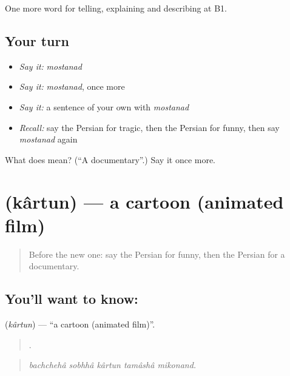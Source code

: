 \begin{grammarlens}[title={What you've built}]
One more word for telling, explaining and describing at B1.
\end{grammarlens}

\subsection*{Your turn}
\begin{itemize}
\raggedright
  \item \emph{Say it:} \emph{mostanad}
  \item \emph{Say it:} \emph{mostanad}, once more
  \item \emph{Say it:} a sentence of your own with \emph{mostanad}
  \item \emph{Recall:} say the Persian for tragic, then the Persian for funny, then say \emph{mostanad} again
\end{itemize}

\begin{tcolorbox}[breakable,colback=teal!4,colframe=teal!35!black,title={Before you move on}]
What does  mean? (\textquotedblleft{}A documentary\textquotedblright{}.) Say it once more.
\end{tcolorbox}
\section[\texorpdfstring{\fa{کارتون} (kârtun)}{کارتون (kârtun)}]{ (kârtun) — a cartoon (animated film)}

\label{lesson:FA-C531-kartun}



\begin{quote}
Before the new one: say the Persian for funny, then the Persian for a documentary.
\end{quote}

\subsection*{You'll want to know: }
\textbf{} (\emph{kârtun}) — \textquotedblleft{}a cartoon (animated film)\textquotedblright{}.

\begin{quote}
     .
\end{quote}

\begin{quote}
\emph{bachchehâ sobhhâ kârtun tamâshâ mikonand.}
\end{quote}


